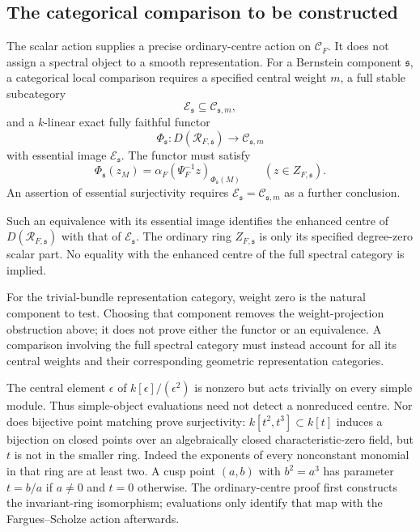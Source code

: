 \subsection{The categorical comparison to be constructed}
\label{v4-arith:w10-e:rem:categorical-comparison}

The scalar action supplies a precise ordinary-centre
action on \(\mathcal C_F\). It does not assign a
spectral object to a smooth representation.
For a Bernstein component \(\mathfrak s\), a
categorical local comparison requires a specified
central weight \(m\), a full stable subcategory
\[
 \mathcal E_{\mathfrak s}\subseteq
       \mathcal C_{\mathfrak s,m},
\]
and a \(k\)-linear exact fully faithful functor
\[
 \Phi_{\mathfrak s}:
       D(\mathcal R_{F,\mathfrak s})
       \longrightarrow \mathcal C_{\mathfrak s,m}
\]
with essential image \(\mathcal E_{\mathfrak s}\).
The functor must satisfy
\[
 \Phi_{\mathfrak s}(z_M)=
   \alpha_F(\Psi_F^{-1}z)_{\Phi_{\mathfrak s}(M)}
 \qquad
 (z\in Z_{F,\mathfrak s}).
\]
An assertion of essential surjectivity requires
\(\mathcal E_{\mathfrak s}=\mathcal C_{\mathfrak s,m}\)
as a further conclusion.

Such an equivalence with its essential image
identifies the enhanced centre of
\(D(\mathcal R_{F,\mathfrak s})\) with that of
\(\mathcal E_{\mathfrak s}\). The ordinary ring
\(Z_{F,\mathfrak s}\) is only its specified
degree-zero scalar part. No equality with the
enhanced centre of the full spectral category is
implied.

For the trivial-bundle representation category, weight
zero is the natural component to test. Choosing that
component removes the weight-projection obstruction
above; it does not prove either the functor or an
equivalence. A comparison involving the full spectral
category must instead account for all its central
weights and their corresponding geometric
representation categories.

\begin{example}
\label{v4-arith:w10-e:ex:pointwise-limits}
The central element $\epsilon$ of $k[\epsilon]/(\epsilon^2)$
is nonzero but acts trivially on every simple module. Thus
simple-object evaluations need not detect a nonreduced centre.
Nor does bijective point matching prove surjectivity:
$k[t^2,t^3]\subset k[t]$ induces a bijection on closed points
over an algebraically closed characteristic-zero field, but
$t$ is not in the smaller ring. Indeed the exponents of every
nonconstant monomial in that ring are at least two. A cusp point
$(a,b)$ with $b^2=a^3$ has parameter $t=b/a$ if $a\ne0$ and
$t=0$ otherwise. The ordinary-centre proof first constructs the
invariant-ring isomorphism; evaluations only identify that map
with the Fargues--Scholze action afterwards.
\end{example}

